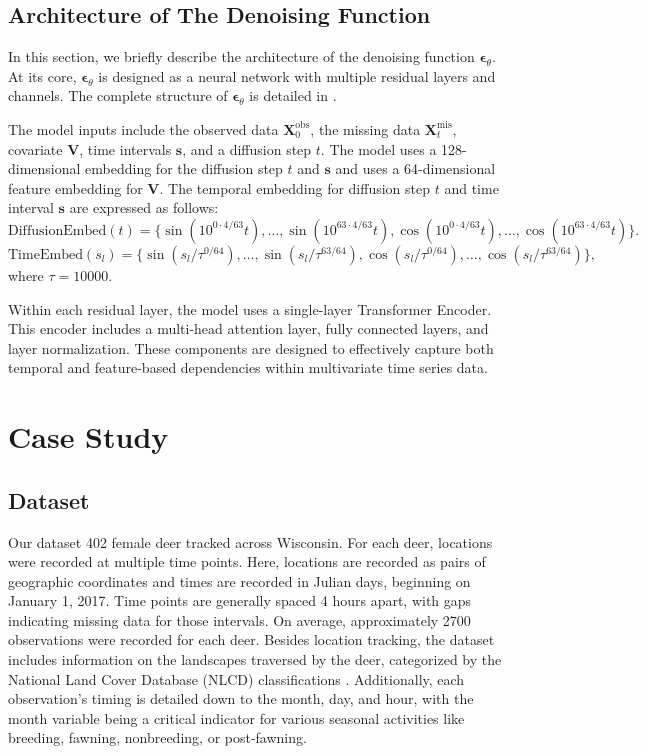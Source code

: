 \documentclass[11pt]{article}
\begin{document}
\subsection{Architecture of The Denoising Function}
In this section, we briefly describe the architecture of the denoising function $\bm{\epsilon}_{\theta}$. At its core, $\bm{\epsilon}_{\theta}$ is designed as a neural network with multiple residual layers and channels. The complete structure of $\bm{\epsilon}_{\theta}$ is detailed in \citet{tashiro2021csdi}.

The model inputs include the observed data $\bm{X}_0^{\mathrm{obs}}$, the missing data $\bm{X}_t^{\mathrm{mis}}$, covariate $\bm{V}$, time intervals $\bm{s}$, and a diffusion step $t$. The model uses a 128-dimensional embedding for 
the diffusion step $t$ and $\bm{s}$ \citep{vaswani2017attention} and uses a 64-dimensional feature embedding for $\bm{V}$. The temporal embedding for diffusion step $t$ and time interval $\bm{s}$ are expressed as follows:
\begin{equation}
	\mathrm{DiffusionEmbed}(t)=\{\sin(10^{0\cdot 4/63}t),\ldots, \sin(10^{63\cdot 4/63}t), \cos(10^{0\cdot 4/63}t),\ldots,\cos(10^{63\cdot 4/63}t)\}.
\end{equation}
\begin{equation}
	\mathrm{TimeEmbed}(s_l)=\{\sin(s_l/\tau^{0/64}),\ldots, \sin(s_l/\tau^{63/64}), \cos(s_l/\tau^{0/64}),\ldots,\cos(s_l/\tau^{63/64})\},
\end{equation}
where $\tau=10000$. 


Within each residual layer, the model uses a single-layer Transformer Encoder. This encoder includes a multi-head attention layer, fully connected layers, and layer normalization. These components are designed to effectively capture both temporal and feature-based dependencies within multivariate time series data. 







\section{Case Study}
\subsection{Dataset}
Our dataset 402 female deer tracked across Wisconsin. For each deer, locations were recorded at multiple time points. Here, locations are recorded as pairs of geographic coordinates and times are recorded in Julian days, beginning on January 1, 2017. Time points are generally spaced 4 hours apart, with gaps indicating missing data for those intervals. On average, approximately 2700 observations were recorded for each deer. Besides location tracking, the dataset includes information on the landscapes traversed by the deer, categorized by the National Land Cover Database (NLCD) classifications \citep{usgs_nlcd_2011}. Additionally, each observation's timing is detailed down to the month, day, and hour, with the month variable being a critical indicator for various seasonal activities like breeding, fawning, nonbreeding, or post-fawning.
\end{document}
